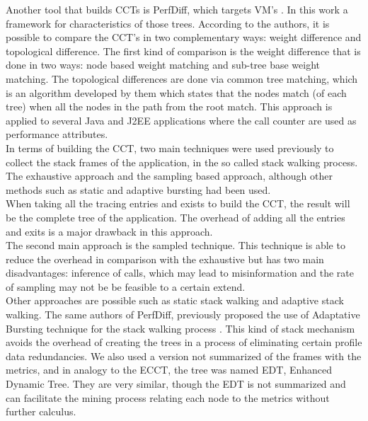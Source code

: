Another tool that builds CCTs is PerfDiff, which targets VM’s \cite{perfdiff}. In this work a framework for characteristics of those trees. According to the authors, it is possible to compare the CCT’s in two complementary ways: weight difference and topological difference. The first kind of comparison is the weight difference that is done in two ways: node based weight matching and sub-tree base weight matching. The topological differences are done via common tree matching, which is an algorithm developed by them which states that the nodes match (of each tree) when all the nodes in the path from the root match. This approach is applied to several Java and J2EE applications where the call counter are used as performance attributes.\\
In terms of building the CCT, two main techniques were used previously to collect the stack frames of the application, in the so called stack walking process. The exhaustive approach and the sampling based approach, although other methods such as static and adaptive bursting had been used.\\
When taking all the tracing entries and exists to build the CCT, the result will be the complete tree of the application. The overhead of adding all the entries and exits is a major drawback in this approach.\\
The second main approach is the sampled technique. This technique is able to reduce the overhead in comparison with the exhaustive but has two main disadvantages: inference of calls, which may lead to misinformation and the rate of sampling may not be be feasible to a certain extend.\\
Other approaches are possible such as static stack walking and adaptive stack walking. The same authors of PerfDiff, previously proposed the use of Adaptative Bursting technique for the stack walking process \cite{adaptative_burst}. This kind of stack mechanism avoids the overhead of creating the trees in a process of eliminating certain profile data redundancies.
We also used a version not summarized of the frames with the metrics, and in analogy to the ECCT, the tree was named EDT, Enhanced Dynamic Tree. They are very similar, though the EDT is not summarized and can facilitate the mining process relating each node to the metrics without further calculus. 
